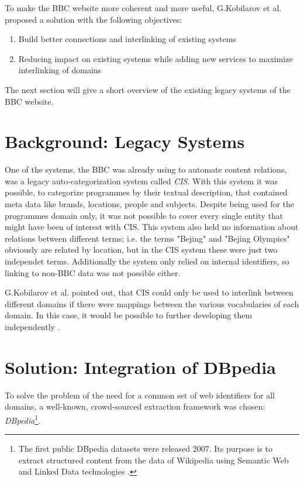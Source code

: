\documentclass{llncs}
\begin{document}
\vspace{15mm}

To make the BBC website more coherent and more useful, G.Kobilarov et al. proposed a solution \cite{mmsw} with the following objectives:
\begin{enumerate}
  \item Build better connections and interlinking of existing systems
  \item Reducing impact on existing systems while adding new services to maximize interlinking of domains
\end{enumerate}

The next section will give a short overview of the existing legacy systems of the BBC website.

\section{Background: Legacy Systems}
%
One of the systems, the BBC was already using to automate content relations, was a legacy auto-categorization system called \textit{CIS}. With this system it was possible, to categorize programmes by their textual description, that contained meta data like brands, locations, people and subjects. Despite being used for the programmes domain only, it was not possible to cover every single entity that might have been of interest with CIS. This system also held no information about relations between different terms; i.e. the terms "Bejing" and "Bejing Olympics" obviously are related by location, but in the CIS system these were just two independet terms. Additionally the system only relied on internal identifiers, so linking to non-BBC data was not possible either.

G.Kobilarov et al. pointed out, that CIS could only be used to interlink between different domains if there were mappings between the various vocabularies of each domain. In this case, it would be possible to further developing them independently \cite{mmsw}.

\section{Solution: Integration of DBpedia}
%
To solve the problem of the need for a common set of web identifiers for all domains, a well-known, crowd-sourced extraction framework was chosen: \textit{DBpedia}\footnote{The first public DBpedia datasets were released 2007. Its purpose is to extract structured content from the data of Wikipedia using Semantic Web and Linked Data technologies \cite{dbpedia}.}.
\end{document}
